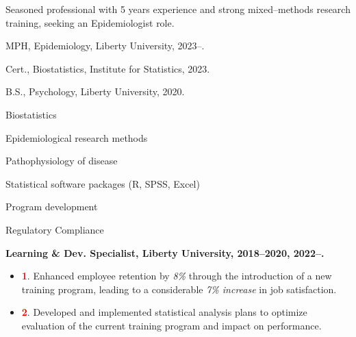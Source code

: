 \documentclass[11.5pt,article,oneside]{memoir}
\begin{document}

\noindent Seasoned professional with 5 years experience and strong mixed–methods research training, seeking an Epidemiologist role. 

\bigskip



\ind MPH, Epidemiology, Liberty University, 2023–.

\ind Cert., Biostatistics, Institute for Statistics, 2023. 


\ind B.S., Psychology, Liberty University, 2020.

\medskip

\medskip

\ind Biostatistics

\ind Epidemiological research methods

\ind Pathophysiology of disease

\ind Statistical software packages (R, SPSS, Excel)

\ind Program development

\ind Regulatory Compliance


\bigskip



\ind \textbf{Learning \& Dev. Specialist, Liberty University, 2018–2020, 2022–.}   
\vspace{.5em}
\begin{itemize}
    \item \textcolor{red}{\textbf{\normalsize 1}}. Enhanced employee retention by \emph{8\%} through the introduction of a new training program, leading to a considerable \emph{7\% increase} in job satisfaction.
    \item \textcolor{red}{\textbf{\normalsize 2}}. Developed and implemented statistical analysis plans to optimize evaluation of the current training program and impact on performance.
\end{itemize}
\medskip
\end{document}
